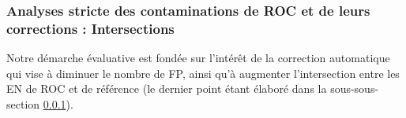 
%    

%    


\subsubsection{Analyses stricte des contaminations de ROC et de leurs corrections : Intersections}
\label{intersections}

Notre démarche évaluative est fondée sur l'intérêt de la correction automatique qui vise à diminuer le nombre de FP, ainsi qu'à augmenter l'intersection entre les EN de ROC et de référence (le dernier point étant élaboré dans la sous-sous-section \ref{intersections}). 


